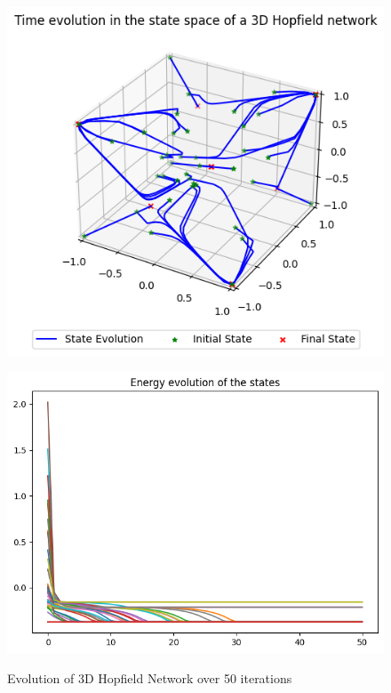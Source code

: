 \begin{figure}[h!]
    \begin{minipage}[t]{0.44\textwidth}
        \includegraphics[width=\textwidth]{figures/hopfield-3d-iterations-50-state-space.png}
        \label{fig:hopfield-3d-iterations-50-state-space}
    \end{minipage}
    \begin{minipage}[t]{0.54\textwidth}
        \includegraphics[width=\textwidth]{figures/hopfield-3d-iterations-50-energy-evolution.png}
        \label{fig:hopfield-3d-iterations-50-energy-evolution}
    \end{minipage}
    \caption{Evolution of 3D Hopfield Network over 50 iterations}
\end{figure}

